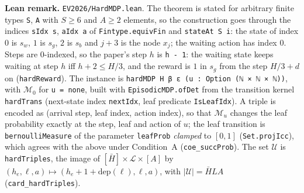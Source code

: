 \textbf{Lean remark.} \texttt{EV2026/HardMDP.lean}. The theorem is stated for arbitrary finite types
\texttt{S}, \texttt{A} with $S \ge 6$ and $A \ge 2$ elements, so the construction goes through the indices
\texttt{sIdx s}, \texttt{aIdx a} of \texttt{Fintype.equivFin} and \texttt{stateAt S i}: the state of index $0$
is $s_w$, $1$ is $s_g$, $2$ is $s_b$ and $j + 3$ is the node $x_j$; the waiting action has index $0$.
Steps are $0$-indexed, so the paper's step $h$ is \texttt{h - 1}: the waiting state keeps waiting at step
$h$ iff $h + 2 \le H/3$, and the reward is $1$ in $s_g$ from the step $H/3 + d$ on (\texttt{hardReward}).
The instance is \texttt{hardMDP H β ε (u : Option (ℕ × ℕ × ℕ))}, with $\mathcal M_0$ for \texttt{u = none},
built with \texttt{EpisodicMDP.ofDet} from the transition kernel \texttt{hardTrans} (next-state index
\texttt{nextIdx}, leaf predicate \texttt{IsLeafIdx}). A triple is encoded as
(arrival step, leaf index, action index), so that $\mathcal M_u$ changes the leaf probability exactly at
the step, leaf and action of $u$; the leaf transition is \texttt{bernoulliMeasure} of the parameter
\texttt{leafProb} \emph{clamped} to $[0,1]$ (\texttt{Set.projIcc}), which agrees with the above under
Condition~A (\texttt{coe\_succProb}). The set $\mathcal U$ is \texttt{hardTriples}, the image of
$[\bar H] \times \mathcal L \times [A]$ by $(h_e, \ell, a) \mapsto (h_e + 1 + \mathrm{dep}(\ell), \ell, a)$, with
$|\mathcal U| = \bar H L A$ (\texttt{card\_hardTriples}).

